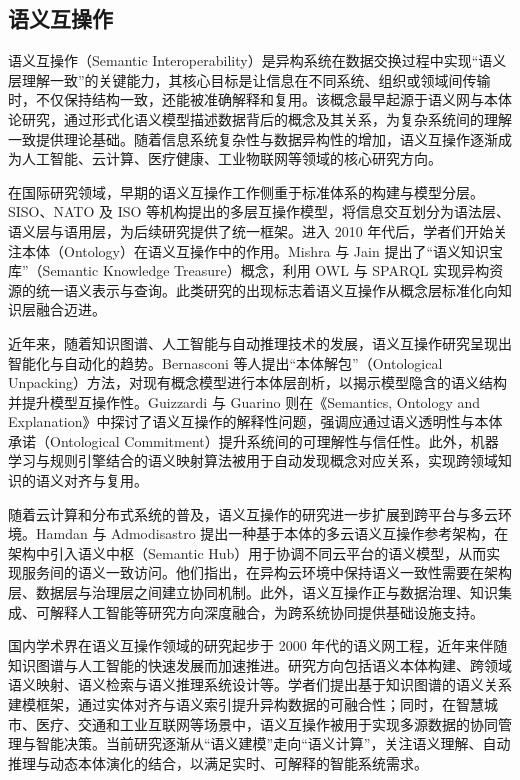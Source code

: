 \subsection{语义互操作}

语义互操作（Semantic Interoperability）是异构系统在数据交换过程中实现“语义层理解一致”的关键能力，其核心目标是让信息在不同系统、组织或领域间传输时，不仅保持结构一致，还能被准确解释和复用。该概念最早起源于语义网与本体论研究，通过形式化语义模型描述数据背后的概念及其关系，为复杂系统间的理解一致提供理论基础。随着信息系统复杂性与数据异构性的增加，语义互操作逐渐成为人工智能、云计算、医疗健康、工业物联网等领域的核心研究方向。

在国际研究领域，早期的语义互操作工作侧重于标准体系的构建与模型分层。SISO、NATO 及 ISO 等机构提出的多层互操作模型，将信息交互划分为语法层、语义层与语用层\cite{SISO_STD_002_2006,CJCSI_6610_01F_2021}，为后续研究提供了统一框架。进入 2010 年代后，学者们开始关注本体（Ontology）在语义互操作中的作用。Mishra 与 Jain 提出了“语义知识宝库”（Semantic Knowledge Treasure）概念，利用 OWL 与 SPARQL 实现异构资源的统一语义表示与查询\cite{Mishra2018Semantic}。此类研究的出现标志着语义互操作从概念层标准化向知识层融合迈进。

近年来，随着知识图谱、人工智能与自动推理技术的发展，语义互操作研究呈现出智能化与自动化的趋势。Bernasconi 等人提出“本体解包”（Ontological Unpacking）方法，对现有概念模型进行本体层剖析，以揭示模型隐含的语义结构并提升模型互操作性\cite{Bernasconi2022Ontological}。Guizzardi 与 Guarino 则在《Semantics, Ontology and Explanation》中探讨了语义互操作的解释性问题，强调应通过语义透明性与本体承诺（Ontological Commitment）提升系统间的可理解性与信任性\cite{Guizzardi2023Explanation}。此外，机器学习与规则引擎结合的语义映射算法被用于自动发现概念对应关系，实现跨领域知识的语义对齐与复用。

随着云计算和分布式系统的普及，语义互操作的研究进一步扩展到跨平台与多云环境。Hamdan 与 Admodisastro 提出一种基于本体的多云语义互操作参考架构，在架构中引入语义中枢（Semantic Hub）用于协调不同云平台的语义模型，从而实现服务间的语义一致访问\cite{Hamdan2023Reference,Hamdan2024SemanticMultiCloud}。他们指出，在异构云环境中保持语义一致性需要在架构层、数据层与治理层之间建立协同机制。此外，语义互操作正与数据治理、知识集成、可解释人工智能等研究方向深度融合，为跨系统协同提供基础设施支持。

国内学术界在语义互操作领域的研究起步于 2000 年代的语义网工程，近年来伴随知识图谱与人工智能的快速发展而加速推进。研究方向包括语义本体构建、跨领域语义映射、语义检索与语义推理系统设计等。学者们提出基于知识图谱的语义关系建模框架，通过实体对齐与语义索引提升异构数据的可融合性；同时，在智慧城市、医疗、交通和工业互联网等场景中，语义互操作被用于实现多源数据的协同管理与智能决策。当前研究逐渐从“语义建模”走向“语义计算”，关注语义理解、自动推理与动态本体演化的结合，以满足实时、可解释的智能系统需求。


